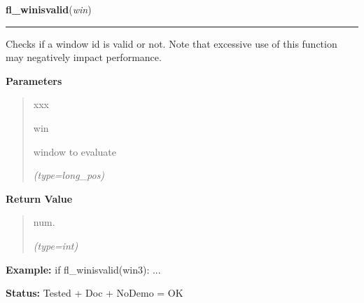 \hspace{.8\funcindent}\begin{boxedminipage}{\funcwidth}

    \raggedright \textbf{fl\_winisvalid}(\textit{win})

    \vspace{-1.5ex}

    \rule{\textwidth}{0.5\fboxrule}
\setlength{\parskip}{2ex}
    Checks if a window id is valid or not. Note that excessive use of this 
    function may negatively impact performance.

\setlength{\parskip}{1ex}
      \textbf{Parameters}
      \vspace{-1ex}

      \begin{quote}
        \begin{Ventry}{xxx}

          \item[win]

          window to evaluate

            {\it (type=long\_pos)}

        \end{Ventry}

      \end{quote}

      \textbf{Return Value}
    \vspace{-1ex}

      \begin{quote}
      num.

      {\it (type=int)}

      \end{quote}

\textbf{Example:} if fl\_winisvalid(win3): ...



\textbf{Status:} Tested + Doc + NoDemo = OK



    \end{boxedminipage}

    \label{xformslib:flxbasic:fl_wintitle}

    \vspace{0.5ex}

